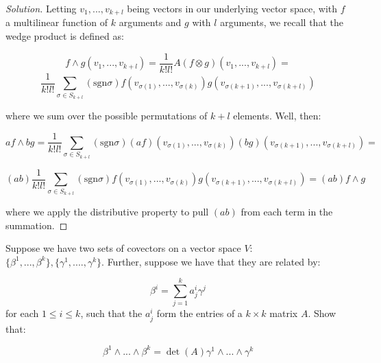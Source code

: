 \documentclass[10pt]{article}
\newenvironment{problem}[2][]{\begin{trivlist}
\item[\hskip \labelsep {\bfseries #1}\hskip \labelsep {\bfseries #2.}]}{\end{trivlist}}
\begin{document}
\begin{proof}[Solution]

Letting $v_1,...,v_{k+l}$ being vectors in our underlying vector space, with $f$ a multilinear function of $k$ arguments and $g$ with $l$ arguments, we recall that the wedge product is defined as:

$$ f \wedge g (v_1,...,v_{k+l}) = \frac{1}{k!l!} A(f \otimes g)(v_1,...,v_{k+l}) = $$
$$  \frac{1}{k!l!} \sum_{\sigma \in S_{k+l}} (\text{sgn} \sigma) f(v_{\sigma(1)},...,v_{\sigma(k)}) g(v_{\sigma(k+1)},...,v_{\sigma(k+l)}) $$

where we sum over the possible permutations of $k+l$ elements. Well, then:

$$af \wedge bg = \frac{1}{k!l!} \sum_{\sigma \in S_{k+l}} (\text{sgn} \sigma) (af)(v_{\sigma(1)},...,v_{\sigma(k)}) (bg)(v_{\sigma(k+1)},...,v_{\sigma(k+l)}) = $$

$$ (ab) \frac{1}{k!l!} \sum_{\sigma \in S_{k+l}} (\text{sgn} \sigma) f(v_{\sigma(1)},...,v_{\sigma(k)}) g(v_{\sigma(k+1)},...,v_{\sigma(k+l)}) = (ab) f \wedge g $$

where we apply the distributive property to pull $(ab)$ from each term in the summation.

\end{proof}

\begin{problem}{Question 7}

Suppose we have two sets of covectors on a vector space $V$: $\{ \beta^1,...,\beta^k \}, \{ \gamma^1,....,\gamma^k \}$. Further, suppose we have that they are related by:

$$ \beta^i  = \sum_{j=1}^k a_j^i \gamma^j$$ for each $1 \leq i \leq k$, such that the $a_j^i$ form the entries of a $k\times k$ matrix $A$. Show that:

$$ \beta^1 \wedge ... \wedge \beta^k = \det(A) \gamma^1 \wedge ... \wedge \gamma^k$$

\end{problem}
\end{document}

